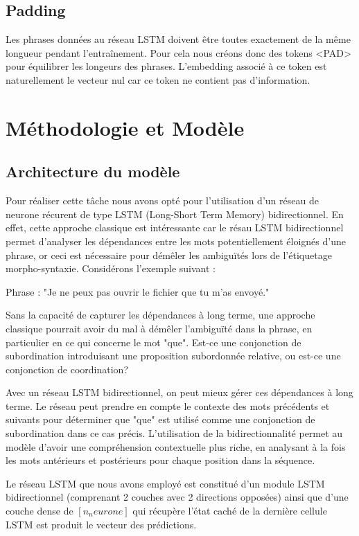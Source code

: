 \documentclass[a4paper]{article}
\begin{document}
\subsection{Padding}

Les phrases données au réseau LSTM doivent être toutes exactement de la même longueur pendant l'entraînement. Pour cela nous créons donc des tokens <PAD> pour équilibrer les longeurs des phrases. L'embedding associé à ce token est naturellement le vecteur nul car ce token ne contient pas d'information. 


\section{Méthodologie et Modèle}


\subsection{Architecture du modèle}
Pour réaliser cette tâche nous avons opté pour l'utilisation d'un réseau de neurone récurent de type LSTM (Long-Short Term Memory) bidirectionnel. En effet, cette approche classique est intéressante car le résau LSTM bidirectionnel permet d'analyser les dépendances entre les mots potentiellement éloignés d'une phrase, or ceci est nécessaire pour démêler les ambiguïtés lors de l'étiquetage morpho-syntaxie. Considérons l'exemple suivant :

Phrase : "Je ne peux pas ouvrir le fichier que tu m'as envoyé."

Sans la capacité de capturer les dépendances à long terme, une approche classique pourrait avoir du mal à démêler l'ambiguïté dans la phrase, en particulier en ce qui concerne le mot "que". Est-ce une conjonction de subordination introduisant une proposition subordonnée relative, ou est-ce une conjonction de coordination?

Avec un réseau LSTM bidirectionnel, on peut mieux gérer ces dépendances à long terme. Le réseau peut prendre en compte le contexte des mots précédents et suivants pour déterminer que "que" est utilisé comme une conjonction de subordination dans ce cas précis. L'utilisation de la bidirectionnalité permet au modèle d'avoir une compréhension contextuelle plus riche, en analysant à la fois les mots antérieurs et postérieurs pour chaque position dans la séquence. 

Le réseau LSTM que nous avons employé est constitué d'un module LSTM bidirectionnel (comprenant 2 couches avec 2 directions opposées) ainsi que d'une couche dense de $[n_neurone]$ qui récupère l'état caché de la dernière cellule LSTM est produit le vecteur des prédictions. 
\end{document}

